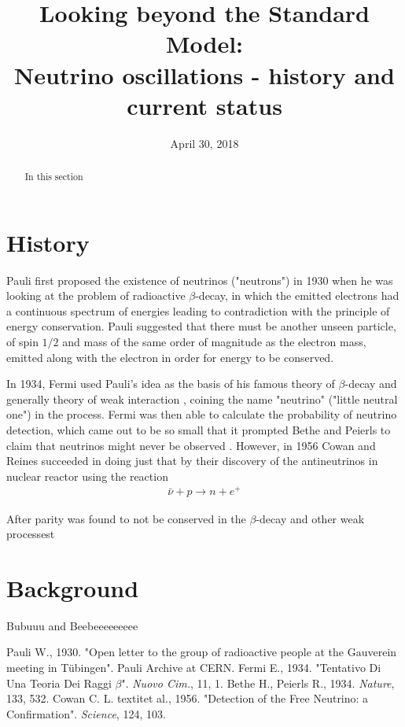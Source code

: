 \documentclass[english]{article}
\begin{document}
\title{Looking beyond the Standard Model: \\Neutrino oscillations - history and current status}
\author{}
\date{April 30, 2018}
\maketitle

\thispagestyle{fancy}

\begin{abstract}
In this section
\end{abstract}

\section{History}
	Pauli first proposed the existence of neutrinos ("neutrons") in 1930 \cite{pauliletter1930} when he was looking at the problem of radioactive $\beta$-decay, in which the emitted electrons had a continuous spectrum of energies leading to contradiction with the principle of energy conservation. Pauli suggested that there must be another unseen particle, of spin $1/2$ and mass of the same order of magnitude as the electron mass, emitted along with the electron in order for energy to be conserved.
    
    In 1934, Fermi used Pauli's idea as the basis of his famous theory of $\beta$-decay and generally theory of weak interaction \cite{fermi1934}, coining the name "neutrino" ("little neutral one") in the process. Fermi was then able to calculate the probability of neutrino detection, which came out to be so small that it prompted Bethe and Peierls to claim that neutrinos might never be observed \cite{bethepeierls1934}. However, in 1956 Cowan and Reines succeeded in doing just that \cite{cowanreines1956} by their discovery of the antineutrinos in nuclear reactor using the reaction
    \begin{gather}
    	\bar{\nu}+p \rightarrow n+e^{+}
    \end{gather}
    
    After parity was found to not be conserved in the $\beta$-decay and other weak processest

\section{Background}

	Bubuuu and Beebeeeeeeeee

\begin{thebibliography}{1}

    Pauli W., 1930. "Open letter to the group of radioactive people at the Gauverein meeting in T\"{u}bingen". Pauli Archive at CERN.
    Fermi E., 1934. "Tentativo Di Una Teoria Dei Raggi $\beta$". \textit{Nuovo Cim.}, 11, 1.
    Bethe H., Peierls R., 1934. \textit{Nature}, 133, 532.
    Cowan C. L. textit{et al.}, 1956. "Detection of the Free Neutrino: a Confirmation". \textit{Science}, 124, 103.
    
\end{thebibliography}
\end{document}
